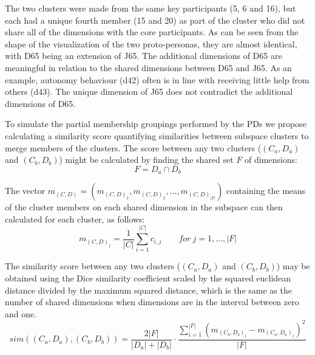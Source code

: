 The two clusters were made from the same key participants (5, 6 and 16), but each had a unique fourth member (15 and 20) as part of the cluster who did not share all of the dimensions with the core participants. As can be seen from the shape of the visualization of the two proto-personas, they are almost identical, with D65 being an extension of J65. The additional dimensions of D65 are meaningful in relation to the shared dimensions between D65 and J65. As an example, autonomy behaviour (d42) often is in line with receiving little help from others (d43). The unique dimension of J65 does not contradict the additional dimensions of D65.

To simulate the partial membership groupings performed by the PDs we propose calculating a similarity score quantifying similarities between subspace clusters to merge members of the clusters. The score between any two clusters ($(C_a,D_a)$ and $(C_b,D_b)$) might be calculated by finding the shared set $F$ of dimensions:
\begin{equation}
F = D_a \cap D_b
\end{equation}

The vector $m_{(C,D)} = (m_{(C,D)_1},m_{(C,D)_2},\dotsc,m_{(C,D)_{|F|}})$ containing the means of the cluster members on each shared dimension in the subspace can then calculated for each cluster, as follows:
\begin{equation}
m_{(C,D)_j} = \frac{1}{|C|}\sum_{i=1}^{|C|}c_{i,j} \qquad for\: j = 1,\dotsc,|F|
\end{equation}

The similarity score between any two clusters ($(C_{a},D_{a})$ and $(C_{b},D_{b})$) may be obtained using the Dice similarity coefficient \citep{Dice1945a} scaled by the squared euclidean distance divided by the maximum squared distance, which is the same as the number of shared dimensions when dimensions are in the interval between zero and one.
\begin{equation}
\label{eq:similarity_score}
 sim((C_{a},D_{a}),(C_{b},D_{b})) = \frac{2|F|}{|D_{a}|+|D_{b}|}\cdot \frac{\sum_{i=1}^{|F|}(m_{(C_{b},D_{b})_i}-m_{(C_{a},D_{a})_i})^2}{|F|} 
\end{equation}


